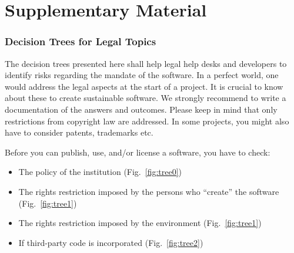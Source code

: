 \documentclass[a4paper,num-refs,numbers,sort&compress]{de-rse}
\begin{document}







%



\renewcommand{\thefigure}{S\arabic{figure}}
\setcounter{figure}{0}  
\section{Supplementary Material}
\subsubsection{Decision Trees for Legal Topics}
The decision trees presented here shall help legal help desks and developers to identify risks regarding the mandate of the software. In a perfect world, one would address the legal aspects at the start of a project. It is crucial to know about these to create sustainable software. We strongly recommend to write a documentation of the answers and outcomes. Please keep in mind that only restrictions from copyright law are addressed. In some projects, you might also have to consider patents, trademarks etc.

Before you can publish, use, and/or license a software, you have to check:
\begin{itemize}
    \item The policy of the institution (Fig.~\ref{fig:tree0})
    \item The rights restriction imposed by the persons who ``create'' the software (Fig.~\ref{fig:tree1})
    \item The rights restriction imposed by the environment (Fig.~\ref{fig:tree1})
    \item If third-party code is incorporated (Fig.~\ref{fig:tree2})
\end{itemize}
\end{document}
